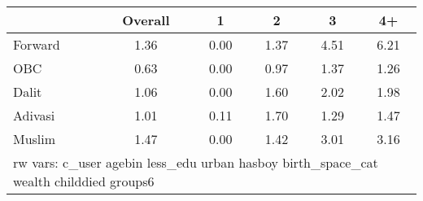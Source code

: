 \begin{tabular}{l*{5}{c}}
\toprule
            &\multicolumn{1}{c}{Overall}&\multicolumn{1}{c}{1}&\multicolumn{1}{c}{2}&\multicolumn{1}{c}{3}&\multicolumn{1}{c}{4+}\\
\midrule
\midrule
Forward     &        1.36&        0.00&        1.37&        4.51&        6.21\\
OBC         &        0.63&        0.00&        0.97&        1.37&        1.26\\
Dalit       &        1.06&        0.00&        1.60&        2.02&        1.98\\
Adivasi     &        1.01&        0.11&        1.70&        1.29&        1.47\\
Muslim      &        1.47&        0.00&        1.42&        3.01&        3.16\\
\bottomrule
\multicolumn{6}{l}{\footnotesize rw vars: c\_user agebin less\_edu urban hasboy birth\_space\_cat wealth childdied groups6}\\
\end{tabular}
